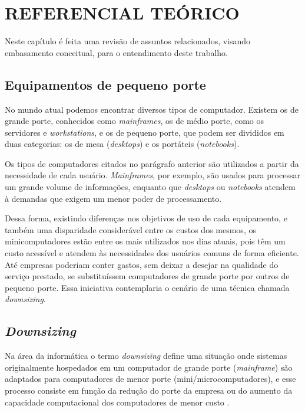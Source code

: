 \chapter{REFERENCIAL TEÓRICO}

Neste capítulo é feita uma revisão de assuntos relacionados, visando embasamento conceitual, para o entendimento deste trabalho.

\section{Equipamentos de pequeno porte}

No mundo atual podemos encontrar diversos tipos de computador. Existem os de grande porte, conhecidos como \textit{mainframes}, os de médio porte, como os servidores e \textit{workstations}, e os de pequeno porte, que podem ser divididos em duas categorias: os de mesa (\textit{desktops}) e os portáteis (\textit{notebooks}).

Os tipos de computadores citados no parágrafo anterior são utilizados a partir da necessidade de cada usuário. \textit{Mainframes}, por exemplo, são usados para processar um grande volume de informações, enquanto que \textit{desktops} ou \textit{notebooks} atendem à demandas que exigem um menor poder de processamento.

Dessa forma, existindo diferenças nos objetivos de uso de cada equipamento, e também uma disparidade considerável entre os custos dos mesmos, os minicomputadores estão entre os mais utilizados nos dias atuais, pois têm um custo acessível e atendem às necessidades dos usuários comuns de forma eficiente. Até empresas poderiam conter gastos, sem deixar a desejar na qualidade do serviço prestado, se substituíssem computadores de grande porte por outros de pequeno porte. Essa iniciativa contemplaria o cenário de uma técnica chamada \textit{downsizing}.

\section{\textit{Downsizing}}

Na área da informática o termo \textit{downsizing} define uma situação onde sistemas originalmente hospedados em um computador de grande porte (\textit{mainframe}) são adaptados para computadores de menor porte (mini/microcomputadores), e esse processo consiste em função da redução do porte da empresa ou do aumento da capacidade computacional dos computadores de menor custo \cite{WIKIPEDIA3}.


